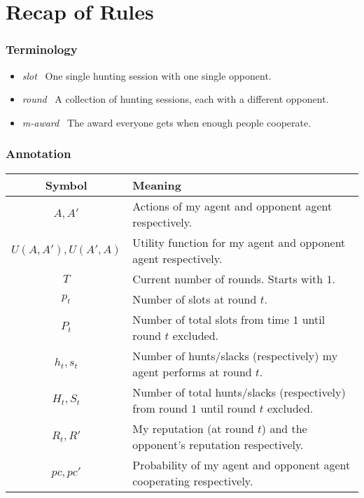 \documentclass[10pt,fleqn]{article}
\begin{document}
\section{Recap of Rules}

\subsubsection{Terminology}
\begin{itemize}
  \item \emph{slot} \dash\ One single hunting session with one single opponent.
  \item \emph{round} \dash\ A collection of hunting sessions, each with a
    different opponent.
  \item \emph{m-award} \dash\ The award everyone gets when enough people
    cooperate.
\end{itemize}

\subsubsection{Annotation}

\begin{tabular}{|c|l|}
  \hline
  Symbol & Meaning \\
  \hline \hline
  $A, A'$ & Actions of my agent and opponent agent respectively. \\
  \hline
  $U(A, A'), U(A', A)$ & Utility function for my agent and opponent agent
  respectively. \\
  \hline
  $T$ & Current number of rounds. Starts with $1$. \\
  \hline
  $p_t$ & Number of slots at round $t$. \\
  \hline
  $P_t$ & Number of total slots from time $1$ until round $t$ excluded. \\
  \hline
  $h_t, s_t$ & Number of hunts/slacks (respectively) my agent performs at round
  $t$. \\
  \hline
  $H_t, S_t$ & Number of total hunts/slacks (respectively) from round $1$ until
  round $t$ excluded. \\
  \hline
  $R_t, R'$ & My reputation (at round $t$) and the opponent's reputation
  respectively. \\
  \hline
  $pc, pc'$ & Probability of my agent and opponent agent cooperating
  respectively. \\
  \hline
\end{tabular}

\end{document}
